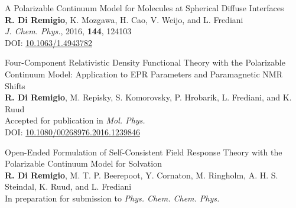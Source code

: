 {\Large
\noindent\textsf{A Polarizable Continuum Model for Molecules at Spherical
Diffuse Interfaces
}
\\
    \textbf{R. Di Remigio}, K. Mozgawa, H. Cao, V. Weijo, and L.
    Frediani
\\
    \textit{J. Chem. Phys.}, \textrm{2016}, \textbf{144}, 124103
  \\
  DOI: \url{10.1063/1.4943782}
}
\vspace*{\fill}

\clearpage


\thispagestyle{empty}
\vspace*{\fill}
\begin{flushright}
{\Huge{}}
\end{flushright}

{\Large
\noindent\textsf{Four-Component Relativistic Density Functional Theory with the
Polarizable Continuum Model: Application to EPR Parameters
and Paramagnetic NMR Shifts
}
\\
  \textbf{R. Di Remigio}, M. Repisky, S. Komorovsky, P. Hrobarik, L.
  Frediani, and K. Ruud
\\
  Accepted for publication in \textit{Mol. Phys.}
  \\
  DOI: \url{10.1080/00268976.2016.1239846}
}
\vspace*{\fill}

\clearpage

\pagebreak

\thispagestyle{empty}
\vspace*{\fill}
\begin{flushright}
{\Huge{}}
\end{flushright}

{\Large
\noindent\textsf{Open-Ended Formulation of Self-Consistent Field Response Theory with
the Polarizable Continuum Model for Solvation
}
\\
    \textbf{R. Di Remigio}, M. T. P. Beerepoot, Y. Cornaton, M. Ringholm,
    A. H. S. Steindal, K. Ruud, and L. Frediani
\\
    In preparation for submission to \textit{Phys. Chem. Chem. Phys.}
}
\vspace*{\fill}

\clearpage
%
\pagebreak
